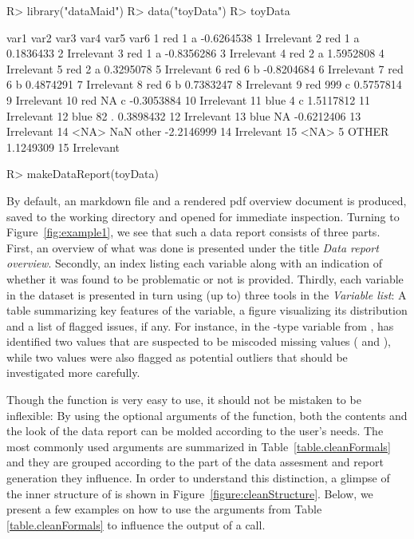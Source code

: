 \documentclass[article,shortnames]{jss}
\begin{document}
\begin{Schunk}
\begin{Sinput}
R> library("dataMaid")
R> data("toyData")
R> toyData
\end{Sinput}
\begin{Soutput}
   var1 var2  var3       var4 var5       var6
1   red    1     a -0.6264538    1 Irrelevant
2   red    1     a  0.1836433    2 Irrelevant
3   red    1     a -0.8356286    3 Irrelevant
4   red    2     a  1.5952808    4 Irrelevant
5   red    2     a  0.3295078    5 Irrelevant
6   red    6     b -0.8204684    6 Irrelevant
7   red    6     b  0.4874291    7 Irrelevant
8   red    6     b  0.7383247    8 Irrelevant
9   red  999     c  0.5757814    9 Irrelevant
10  red   NA     c -0.3053884   10 Irrelevant
11 blue    4     c  1.5117812   11 Irrelevant
12 blue   82     .  0.3898432   12 Irrelevant
13 blue   NA       -0.6212406   13 Irrelevant
14 <NA>  NaN other -2.2146999   14 Irrelevant
15 <NA>    5 OTHER  1.1249309   15 Irrelevant
\end{Soutput}
\end{Schunk}
\begin{Schunk}
\begin{Sinput}
R> makeDataReport(toyData)
\end{Sinput}
\end{Schunk}

By default, an  markdown file and a rendered pdf overview
document is produced, saved to the working directory and
opened for immediate inspection. Turning to Figure~\ref{fig:example1},
we see that such a data report consists of three
parts. First, an overview of what was done is presented under the
title \textit{Data report overview}. Secondly, an index listing each variable along with an indication of whether it was found to be problematic or not is provided. Thirdly, each variable in the
dataset is presented in turn using (up to) three tools in the
\textit{Variable list}: A table summarizing key features of the
variable, a figure visualizing its distribution and a
list of flagged issues, if any. For instance, in the -type variable
 from ,  has identified two values that
are suspected to be miscoded missing values ( and ),
while two values were also flagged as potential outliers that should
be investigated more carefully.

Though the  function is very easy to use, it should not be
mistaken to be inflexible: By using the optional arguments of the function, 
both the contents and the look of the data report can be molded 
according to the user's needs. The most commonly used arguments are summarized in
Table~\ref{table.cleanFormals} and they are grouped according to the
part of the data assesment and report generation they influence. In order to understand
this distinction, a glimpse of the inner structure of  is
shown in Figure~\ref{figure:cleanStructure}. Below, we present a few
examples on how to use the arguments from Table \ref{table.cleanFormals}
 to influence the output of a  call.
\end{document}
